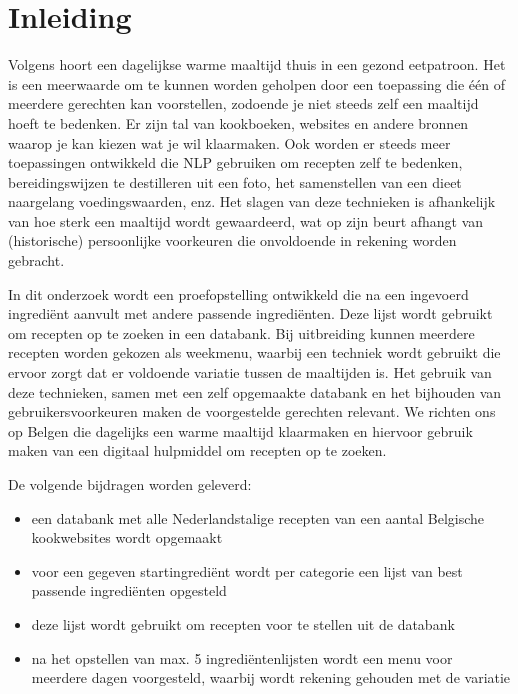 \documentclass{hogent-article}
\begin{document}


\section{Inleiding}%
\label{sec:inleiding}


Volgens\cite{Galle2016} hoort een dagelijkse warme maaltijd thuis in een gezond eetpatroon. Het is een meerwaarde om te kunnen worden geholpen door een toepassing die één of meerdere gerechten kan voorstellen, zodoende je niet steeds zelf een maaltijd hoeft te bedenken. Er zijn tal van kookboeken, websites en andere bronnen waarop je kan kiezen wat je wil klaarmaken. Ook worden er steeds meer toepassingen ontwikkeld die NLP gebruiken om recepten zelf te bedenken, bereidingswijzen te destilleren uit een foto, het samenstellen van een dieet naargelang voedingswaarden, enz. Het slagen van deze technieken is afhankelijk van hoe sterk een maaltijd wordt gewaardeerd, wat op zijn beurt afhangt van (historische) persoonlijke voorkeuren die onvoldoende in rekening worden gebracht.

In dit onderzoek wordt een proefopstelling ontwikkeld die na een ingevoerd ingrediënt aanvult met andere passende ingrediënten. Deze lijst wordt gebruikt om recepten op te zoeken in een databank. Bij uitbreiding kunnen meerdere recepten worden gekozen als weekmenu, waarbij een techniek wordt gebruikt die ervoor zorgt dat er voldoende variatie tussen de maaltijden is. Het gebruik van deze technieken, samen met een zelf opgemaakte databank en het bijhouden van gebruikersvoorkeuren maken de voorgestelde gerechten relevant. We richten ons op Belgen die dagelijks een warme maaltijd klaarmaken en hiervoor gebruik maken van een digitaal hulpmiddel om recepten op te zoeken. 

De volgende bijdragen worden geleverd:
\begin{itemize}
    \item een databank met alle Nederlandstalige recepten van een aantal Belgische kookwebsites wordt opgemaakt
    \item voor een gegeven startingrediënt wordt per categorie een lijst van best passende ingrediënten opgesteld
    \item deze lijst wordt gebruikt om recepten voor te stellen uit de databank
    \item na het opstellen van max. 5 ingrediëntenlijsten wordt een menu voor meerdere dagen voorgesteld, waarbij wordt rekening gehouden met de variatie
\end{itemize}
\end{document}
